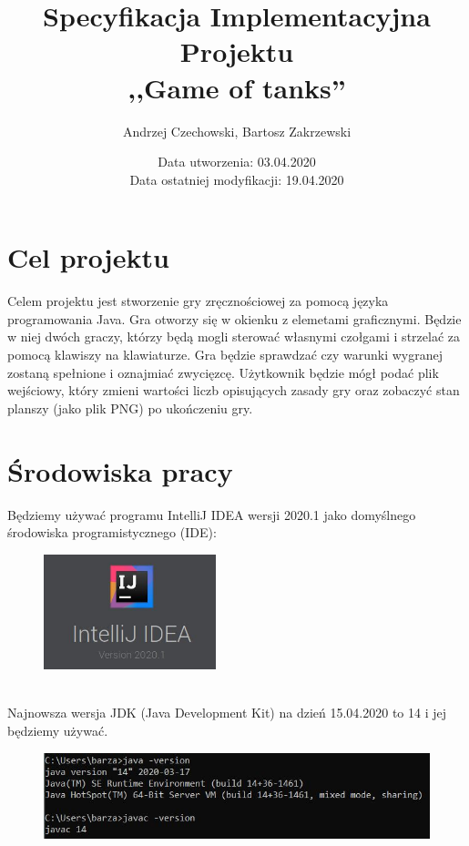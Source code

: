 \documentclass{article}
\title {Specyfikacja Implementacyjna Projektu \\ ,,Game of tanks''}
\author{Andrzej Czechowski, Bartosz Zakrzewski}
\date{Data utworzenia: 03.04.2020 \\ Data ostatniej modyfikacji: 19.04.2020}
\begin{document}
\maketitle
\thispagestyle{empty}

\clearpage

\section{Cel projektu} 

Celem projektu jest stworzenie gry zręcznościowej za pomocą języka programowania Java. Gra otworzy się w okienku z elemetami graficznymi. Będzie w niej dwóch graczy, którzy będą mogli sterować własnymi czołgami i strzelać za pomocą klawiszy na klawiaturze. Gra będzie sprawdzać czy warunki wygranej zostaną spełnione i oznajmiać zwycięzcę. Użytkownik będzie mógł podać plik wejściowy, który zmieni wartości liczb opisujących zasady gry oraz zobaczyć stan planszy (jako plik PNG) po ukończeniu gry.

\section{Środowiska pracy}

Będziemy używać programu IntelliJ IDEA wersji 2020.1 jako domyślnego środowiska programistycznego (IDE):\\

\begin{figure} [hbt!]
   \includegraphics[width=5cm, center]{img/Intellij.JPG}
\end{figure}\\

Najnowsza wersja JDK (Java Development Kit) na dzień 15.04.2020 to 14 i jej będziemy używać.
\begin{figure} [hbt!]
    \includegraphics[width=13cm, center]{img/zb_java_windows.JPG}
\end{figure}\\
\end{document}
